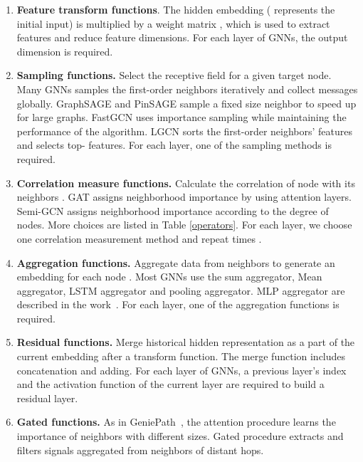\documentclass{article}
\begin{document}
\begin{enumerate}

	\item \textbf{Feature transform functions}. The hidden embedding  ( represents the initial input) is multiplied by a weight matrix , which is used to extract features and reduce feature dimensions. For each layer of GNNs, the output dimension  is required.
	
	\item \textbf{Sampling functions.} Select the receptive field  for a given target node. Many GNNs samples the first-order neighbors iteratively and collect messages globally. GraphSAGE and PinSAGE sample a fixed size neighbor to speed up for large graphs. FastGCN uses importance sampling while maintaining the performance of the algorithm. LGCN sorts the first-order neighbors' features and  selects top- features.
	For each layer, one of the sampling methods  is required.
	
	\item \textbf{Correlation measure functions.} Calculate the correlation of node  with its neighbors . GAT assigns neighborhood importance by using attention layers. Semi-GCN assigns neighborhood importance according to the degree of nodes. More choices are listed in Table \ref{operators}.
	For each layer, we choose one correlation measurement method  and repeat times .
	
	\item \textbf{Aggregation functions.}  Aggregate data from neighbors to generate an embedding for each node . Most GNNs use the sum aggregator, Mean aggregator, LSTM aggregator and pooling aggregator. MLP aggregator are described in the work~\cite{Xu2018HowPA}. 
	For each layer, one of the aggregation functions  is required.
	
	\item \textbf{Residual functions.} Merge historical hidden representation  as a part of the current embedding after a transform function. The merge function includes concatenation and adding.
	For each layer of GNNs, a previous layer's index  and the activation function  of the current layer are required to build a residual layer.
	
	\item \textbf{Gated functions.}  As in GeniePath~\cite{GeniePath}, the attention procedure learns the importance of neighbors with different sizes. Gated procedure extracts and filters signals aggregated from neighbors of distant hops.
\end{enumerate}
\end{document}
